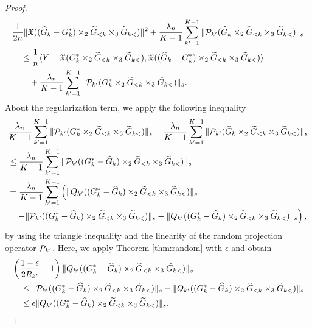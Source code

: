\begin{proof}
\begin{align}
	 &\frac{1}{2n} \| \mathfrak{X}((\widehat{G}_k - G_k^*) \times_2 \widetilde{G}_{<k} \times_3 \widetilde{G}_{k<})  \|^2 + \frac{\lambda_n}{K-1}\sum_{k'=1}^{K-1} \|\mathcal{P}_{k'}(\widehat{G}_k \times_2 \widetilde{G}_{<k} \times_3 \widetilde{G}_{k<})\|_{s}  \notag \\
	 & \quad \leq \frac{1}{n} \langle Y - \mathfrak{X}(G_k^* \times_2 \widetilde{G}_{<k} \times_3 \widetilde{G}_{k<}), \mathfrak{X}((\widehat{G}_k - G_k^*) \times_2 \widetilde{G}_{<k} \times_3 \widetilde{G}_{k<}) \rangle \notag \\
	 & \quad \quad  + \frac{\lambda_n}{K-1}\sum_{k'=1}^{K-1} \|\mathcal{P}_{k'}(G_k^* \times_2 \widetilde{G}_{<k} \times_3 \widetilde{G}_{k<})\|_{s}. \label{ineq:basic0}
\end{align}
About the regularization term, we apply the following inequality
\begin{align}
	&\frac{\lambda_n}{K-1}\sum_{k'=1}^{K-1} \|\mathcal{P}_{k'}(G_k^* \times_2 \widetilde{G}_{<k} \times_3 \widetilde{G}_{k<})\|_{s} - \frac{\lambda_n}{K-1}\sum_{k'=1}^{K-1} \|\mathcal{P}_{k'}(\widehat{G}_k \times_2 \widetilde{G}_{<k} \times_3 \widetilde{G}_{k<})\|_{s} \notag \\
	&\leq \frac{\lambda_n}{K-1}\sum_{k'=1}^{K-1} \|\mathcal{P}_{k'}((G_k^* - \widehat{G}_k) \times_2 \widetilde{G}_{<k} \times_3 \widetilde{G}_{k<})\|_{s} \notag \\
	&= \frac{\lambda_n}{K-1}\sum_{k'=1}^{K-1} \left(\|Q_{k'}((G_k^* - \widehat{G}_k) \times_2 \widetilde{G}_{<k} \times_3 \widetilde{G}_{k<})\|_{s}  \right. \notag \\
	& \quad  \left. -  \|\mathcal{P}_{k'}((G_k^* - \widehat{G}_k) \times_2 \widetilde{G}_{<k} \times_3 \widetilde{G}_{k<})\|_{s} -  \|Q_{k'}((G_k^* - \widehat{G}_k) \times_2 \widetilde{G}_{<k} \times_3 \widetilde{G}_{k<})\|_{s}  \right), \label{ineq:pq}
\end{align}
by using the triangle inequality and the linearity of the random projection operator $\mathcal{P}_{k'}$.
Here, we apply Theorem \ref{thm:random} with $\epsilon$ and obtain
\begin{align*}
	 &\left( \frac{1 - \epsilon}{2 R_{k'}} - 1 \right)\|Q_{k'}((G_k^* - \widehat{G}_k) \times_2 \widetilde{G}_{<k} \times_3 \widetilde{G}_{k<})\|_{s} \\
	 &\quad \leq \|\mathcal{P}_{k'}((G_k^* - \widehat{G}_k) \times_2 \widetilde{G}_{<k} \times_3 \widetilde{G}_{k<})\|_{s} -  \|Q_{k'}((G_k^* - \widehat{G}_k) \times_2 \widetilde{G}_{<k} \times_3 \widetilde{G}_{k<})\|_{s} \\
	 &\quad \leq \epsilon \|Q_{k'}((G_k^* - \widehat{G}_k) \times_2 \widetilde{G}_{<k} \times_3 \widetilde{G}_{k<})\|_{s}.
\end{align*}

\end{proof}

